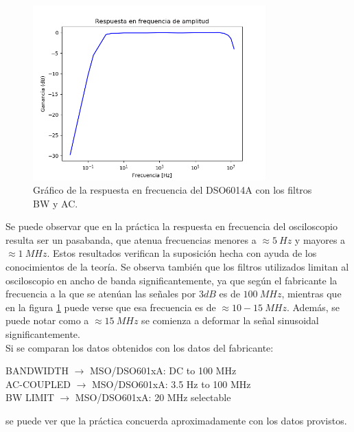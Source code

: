 \documentclass[a4paper]{article}
\begin{document}
\begin{figure}[H]
	\centering
	\includegraphics[width=0.8\textwidth]{resp_freq_osci.png}
	\caption{Gráfico de la respuesta en frecuencia del DSO6014A con los filtros BW y AC.} 
	\label{graf:resp_freq_osci}
\end{figure}

Se puede observar que en la práctica la respuesta en frecuencia del osciloscopio resulta ser un pasabanda, que atenua frecuencias menores a $\approx 5 \ Hz$ y mayores a $\approx 1 \ MHz$. Estos resultados verifican la suposición hecha con ayuda de los conocimientos de la teoría. Se observa también que los filtros utilizados limitan al osciloscopio en ancho de banda significantemente, ya que según el fabricante la frecuencia a la que se atenúan las señales por $3dB$ es de $100 \ MHz$, mientras que en la figura \ref{graf:resp_freq_osci} puede verse que esa frecuencia es de $\approx 10-15 \ MHz$. Además, se puede notar como a $\approx 15 \ MHz$ se comienza a deformar la señal sinusoidal significantemente.\\

Si se comparan los datos obtenidos con los datos del fabricante:
\begin{center}
BANDWIDTH $\rightarrow$ MSO/DSO601xA: DC to 100 MHz\\
AC-COUPLED $\rightarrow$ MSO/DSO601xA: 3.5 Hz to 100 MHz\\
BW LIMIT $\rightarrow$ MSO/DSO601xA: 20 MHz selectable\\
\end{center}
se puede ver que la práctica concuerda aproximadamente con los datos provistos.
\end{document}
